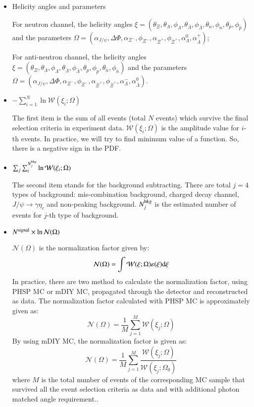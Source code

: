 \begin{itemize}
	\item Helicity angles and parameters

		For neutron channel, the helicity angles $\xi = (\theta_{\Xi}, \theta_{\Lambda}, \phi_{\Lambda}, 
		\theta_{\bar{\Lambda}}, \phi_{\bar{\Lambda}}, \theta_{n}, \phi_{n}, 
		\theta_{\bar{p}}, \phi_{\bar{p}})$ 
		and the parameters $\Omega = (\alpha_{J/\psi}, \Delta \Phi, \alpha_{\Xi^-},
		\phi_{\Xi^-}, \alpha_{\bar{\Xi}^+}, \phi_{\bar{\Xi}^+}, \alpha_{\Lambda}^0,
		\alpha_{\bar{\Lambda}}^+)$;

		For anti-neutron channel, the helicity angles 
		$\xi = (\theta_{\Xi}, \theta_{\Lambda}, \phi_{\Lambda}, 
		\theta_{\bar{\Lambda}}, \phi_{\bar{\Lambda}}, \theta_{p}, \phi_{p}, 
		\theta_{\bar{n}}, \phi_{\bar{n}})$ 
		and the parameters $\Omega = (\alpha_{J/\psi}, \Delta \Phi, \alpha_{\Xi^-},
		\phi_{\Xi^-}, \alpha_{\bar{\Xi}^+}, \phi_{\bar{\Xi}^+}, \alpha_{\Lambda}^-,
		\alpha_{\bar{\Lambda}}^0)$.
	\item $-\sum_{i = 1}^N\ln \mathcal{W}(\xi_i;\Omega)$

		The first item is the sum of all events (total $N$ events) which survive the 
		final selection criteria in experiment data. $\mathcal{W}(\xi_i;\Omega)$ is 
		the amplitude value for $i$-th events. In practice, we will try to find 
		minimum value of a function. So, there is a negative sign in the PDF.
	\item $\sum_j \sum_i^{N_j^{\rm bkg}}\ln \mathcal{W}(\xi_i;\Omega)$

		The second item stands for the background subtracting. There are total
		$j = 4$ types of background: mis-combination background, charged decay
		channel, $J/\psi \to \gamma \eta_c$ and non-peaking background. $N_j^{\rm bkg}$
		is the estimated number of events for $j$-th type of background.

	\item $N^{\rm signal} \times \ln \mathcal{N}(\Omega)$

		$\mathcal{N}(\Omega)$ is the normalization factor given by:
		\begin{equation}
			\mathcal{N}(\Omega) = \int \mathcal{W}(\xi;\Omega)\varepsilon(\xi) {\rm d} \xi 
		\end{equation}
		In practice, there are two method to calculate the normalization factor,
		using PHSP MC or mDIY MC, propagated through the detector and reconstructed as
		data. The normalization factor calculated with PHSP MC is approximately given 
		as:
		\begin{equation}
			\mathcal{N}(\Omega) = \frac{1}{M} \sum_{j=1}^M \mathcal{W}(\xi_j;\Omega)	
		\end{equation}
		By using mDIY MC, the normalization factor is given as:
		\begin{equation}
			\mathcal{N}(\Omega) = \frac{1}{M} \sum_{j=1}^M \frac{\mathcal{W}(\xi_j;\Omega)	}{\mathcal{W}(\xi_j;\Omega_0)}
		\end{equation}
		where $M$ is the total number of events of the corresponding MC sample that  
		survived all the event selection criteria as data and with additional photon 
		matched angle requirement..


\end{itemize}
